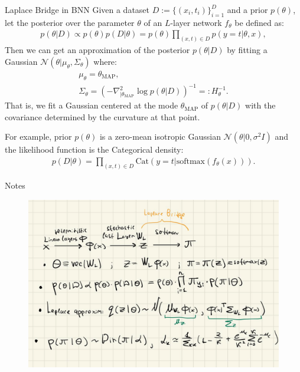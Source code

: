 \documentclass{beamer}
\begin{document}
\begin{frame}{Laplace Bridge in BNN}
Given a dataset \( D := \{(x_i, t_i)\}_{i=1}^D \) and a prior \( p(\theta) \), let the posterior over the parameter \( \theta \) of an \( L \)-layer network \( f_\theta \) be defined as:
\begin{gather*}
p(\theta|D) \propto p(\theta)p(D|\theta) = p(\theta) \prod_{(x,t) \in D} p(y = t|\theta, x), \tag{40}
\end{gather*}
Then we can get an approximation of the posterior \( p(\theta|D) \) by fitting a Gaussian \( \mathcal{N} (\theta|\mu_\theta, \Sigma_\theta) \) where:
\begin{gather*}
\mu_\theta = \theta_{\text{MAP}}, \\
\Sigma_\theta = \left(-\nabla^2_{|\theta_{\text{MAP}}} \log p(\theta|D)\right)^{-1} =: H^{-1}_\theta.
\end{gather*}
That is, we fit a Gaussian centered at the mode \( \theta_{\text{MAP}} \) of \( p(\theta|D) \) with the covariance determined by the curvature at that point. 

For example, prior \( p(\theta) \) is a zero-mean isotropic Gaussian \( \mathcal{N} (\theta|0, \sigma^2 I) \) and the likelihood function is the Categorical density:
\begin{gather*}
p(D|\theta) = \prod_{(x,t) \in D} \text{Cat}(y = t|\text{softmax}(f_\theta(x))).
\end{gather*}

\end{frame}




\begin{frame}{Notes}
 \begin{figure}
        \centering
        \includegraphics[width=1.0\textwidth]{figs/my.png} %
    \end{figure}

\end{frame}
\end{document}

